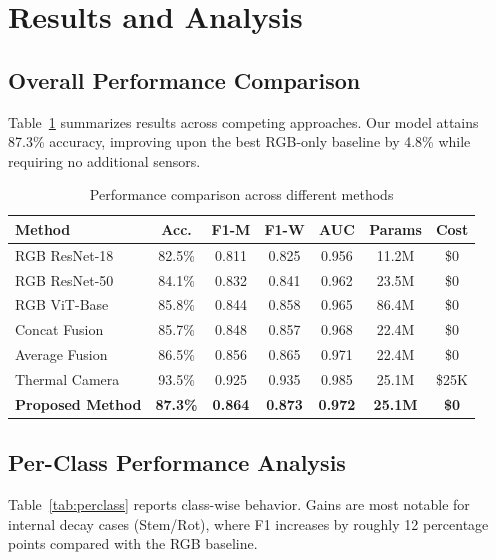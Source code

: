 \documentclass[utf8]{FrontiersinHarvard} %
\begin{document}
\section{Results and Analysis}

\subsection{Overall Performance Comparison}
Table~\ref{tab:performance} summarizes results across competing approaches. Our model attains 87.3\% accuracy, improving upon the best RGB-only baseline by 4.8\% while requiring no additional sensors.

\begin{table}[h!]
    \caption{Performance comparison across different methods}
    \label{tab:performance}
    \raggedright
    \scriptsize
    \begin{tabular}{lcccccc}
        \toprule
        \textbf{Method} & \textbf{Acc.} & \textbf{F1-M} & \textbf{F1-W} & \textbf{AUC} & \textbf{Params} & \textbf{Cost} \\
        \midrule
        RGB ResNet-18 & 82.5\% & 0.811 & 0.825 & 0.956 & 11.2M & \$0 \\
        RGB ResNet-50 & 84.1\% & 0.832 & 0.841 & 0.962 & 23.5M & \$0 \\
        RGB ViT-Base & 85.8\% & 0.844 & 0.858 & 0.965 & 86.4M & \$0 \\
        Concat Fusion & 85.7\% & 0.848 & 0.857 & 0.968 & 22.4M & \$0 \\
        Average Fusion & 86.5\% & 0.856 & 0.865 & 0.971 & 22.4M & \$0 \\
        Thermal Camera & 93.5\% & 0.925 & 0.935 & 0.985 & 25.1M & \$25K \\
        \rowcolor{green!20}
        \textbf{Proposed Method} & \textbf{87.3\%} & \textbf{0.864} & \textbf{0.873} & \textbf{0.972} & \textbf{25.1M} & \textbf{\$0} \\
        \bottomrule
    \end{tabular}
\end{table}

\subsection{Per-Class Performance Analysis}
Table~\ref{tab:perclass} reports class-wise behavior. Gains are most notable for internal decay cases (Stem/Rot), where F1 increases by roughly 12 percentage points compared with the RGB baseline.
\end{document}
